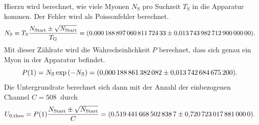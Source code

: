 Hierzu wird berechnet, wie viele Myonen $N_{\text{S}}$ pro Suchzeit $T_{\text{S}}$ in die Apparatur kommen. Der Fehler wird als Poissonfehler berechnet.
\begin{equation*}
  N_{\text{S}} = T_{\text{S}}\frac{N_{\text{Start}} \pm \sqrt{ N_{\text{Start}}} }{T_{\text{G}}} = \SI{0.00018889706081172433 \pm 0.0137439827129}{}.
\end{equation*}
Mit dieser Zählrate wird die Wahrscheinlichkeit $P$ berechnet, dass sich genau ein Myon in der Apparatur befindet.
\begin{equation*}
  P(1) = N_{\text{S}} \exp{(-N_{\text{S}})} = \SI{0.000188861382082 \pm 0.0137426846752}{}.
\end{equation*}
Die Untergrundrate berechnet sich dann mit der Anzahl der einbezogenen Channel $C=\SI{508}{}$ durch
\begin{equation*}
  U_{\text{0,theo}}= P(1) \frac{ N_{\text{Start}} \pm \sqrt{ N_{\text{Start}} }}{C} = \SI{0.5194416685028387 \pm 0.720723017881}{}.
\end{equation*}

\FloatBarrier
